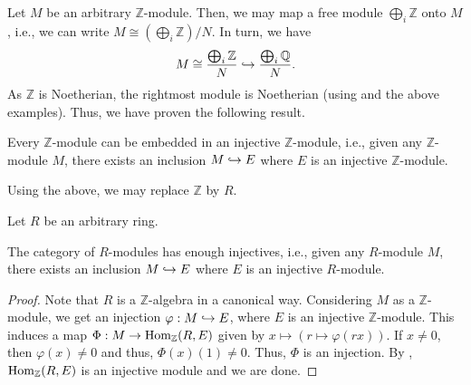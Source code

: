 Let $M$ be an arbitrary $\mathbb{Z}$-module. Then, we may map a free module $\bigoplus_{i} \mathbb{Z}$ onto $M$, i.e., we can write $M \cong \left(\bigoplus_{i} \mathbb{Z}\right)/N$. In turn, we have
\begin{equation*} 
	M \cong \frac{\bigoplus_{i} \mathbb{Z}}{N} \hookrightarrow \frac{\bigoplus_{i} \mathbb{Q}}{N}.
\end{equation*}
As $\mathbb{Z}$ is Noetherian, the rightmost module is Noetherian (using  and the above examples). Thus, we have proven the following result.

\begin{prop}
	Every $\mathbb{Z}$-module can be embedded in an injective $\mathbb{Z}$-module, i.e., given any $\mathbb{Z}$-module $M$, there exists an inclusion $M \hookrightarrow E$ where $E$ is an injective $\mathbb{Z}$-module.
\end{prop}

Using the above, we may replace $\mathbb{Z}$ by $R$.

\begin{thm} \label{thm:enough-injectives-R-mod}
	Let $R$ be an arbitrary ring. 

	The category of $R$-modules has enough injectives, i.e., given any $R$-module $M$, there exists an inclusion $M \hookrightarrow E$ where $E$ is an injective $R$-module.
\end{thm}
\begin{proof} 
	Note that $R$ is a $\mathbb{Z}$-algebra in a canonical way. \newline
	Considering $M$ as a $\mathbb{Z}$-module, we get an injection $\varphi : M \hookrightarrow E$, where $E$ is an injective $\mathbb{Z}$-module. \newline
	This induces a map $\Phi : M \to \operatorname{Hom}_{\mathbb{Z}}(R, E)$ given by $x \mapsto (r \mapsto \varphi(rx))$. If $x \neq 0$, then $\varphi(x) \neq 0$ and thus, $\Phi(x)(1) \neq 0$. Thus, $\Phi$ is an injection. \newline
	By , $\operatorname{Hom}_{\mathbb{Z}}(R, E)$ is an injective module and we are done.
\end{proof}

